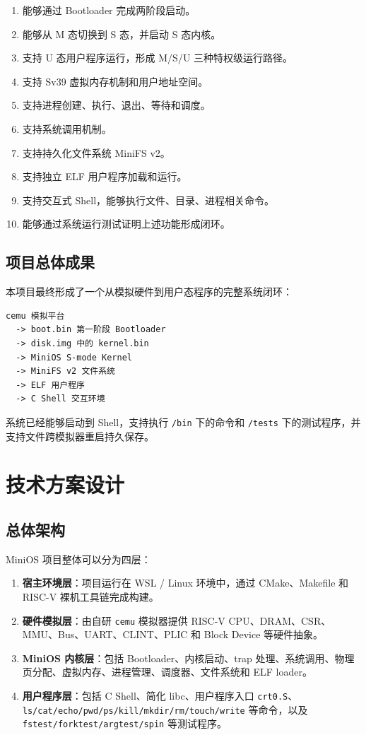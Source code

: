 \documentclass[UTF8,a4paper,12pt,openany,fontset=fandol]{ctexrep}
\begin{document}
\begin{enumerate}
\item 能够通过 Bootloader 完成两阶段启动。
\item 能够从 M 态切换到 S 态，并启动 S 态内核。
\item 支持 U 态用户程序运行，形成 M/S/U 三种特权级运行路径。
\item 支持 Sv39 虚拟内存机制和用户地址空间。
\item 支持进程创建、执行、退出、等待和调度。
\item 支持系统调用机制。
\item 支持持久化文件系统 MiniFS v2。
\item 支持独立 ELF 用户程序加载和运行。
\item 支持交互式 Shell，能够执行文件、目录、进程相关命令。
\item 能够通过系统运行测试证明上述功能形成闭环。
\end{enumerate}

\section{项目总体成果}

本项目最终形成了一个从模拟硬件到用户态程序的完整系统闭环：

\begin{lstlisting}
cemu 模拟平台
  -> boot.bin 第一阶段 Bootloader
  -> disk.img 中的 kernel.bin
  -> MiniOS S-mode Kernel
  -> MiniFS v2 文件系统
  -> ELF 用户程序
  -> C Shell 交互环境
\end{lstlisting}

系统已经能够启动到 Shell，支持执行 \nolinkurl{/bin} 下的命令和 \nolinkurl{/tests} 下的测试程序，并支持文件跨模拟器重启持久保存。

\chapter{技术方案设计}

\section{总体架构}

MiniOS 项目整体可以分为四层：

\begin{enumerate}
\item \textbf{宿主环境层}：项目运行在 WSL / Linux 环境中，通过 CMake、Makefile 和 RISC-V 裸机工具链完成构建。
\item \textbf{硬件模拟层}：由自研 \nolinkurl{cemu} 模拟器提供 RISC-V CPU、DRAM、CSR、MMU、Bus、UART、CLINT、PLIC 和 Block Device 等硬件抽象。
\item \textbf{MiniOS 内核层}：包括 Bootloader、内核启动、trap 处理、系统调用、物理页分配、虚拟内存、进程管理、调度器、文件系统和 ELF loader。
\item \textbf{用户程序层}：包括 C Shell、简化 libc、用户程序入口 \nolinkurl{crt0.S}、\nolinkurl{ls/cat/echo/pwd/ps/kill/mkdir/rm/touch/write} 等命令，以及 \nolinkurl{fstest/forktest/argtest/spin} 等测试程序。
\end{enumerate}
\end{document}
